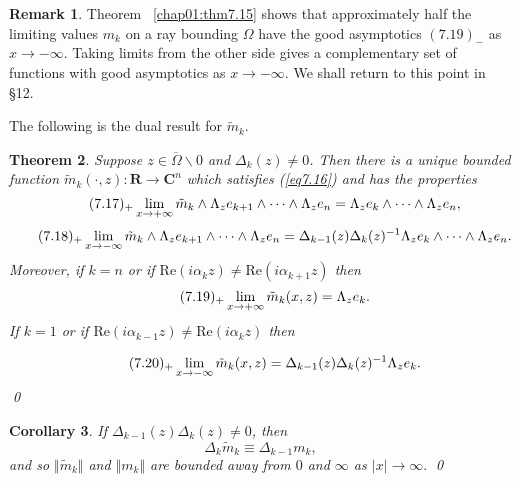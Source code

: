 \documentclass{surv-l}
\theoremstyle{plain}
\newtheorem{theorem}{Theorem}[section]
\newtheorem{cor}[theorem]{Corollary}
\theoremstyle{definition}
\newtheorem{remark}[theorem]{Remark}
\numberwithin{equation}{chapter}
\begin{document}
\setcounter{theorem}{22}
\begin{remark} Theorem ~\ref{chap01:thm7.15} shows that approximately half the limiting values $m_{k}$ on a ray bounding $\Omega$ have the good asymptotics $(7.19)_{-}$ as $ x\rightarrow-\infty$. Taking limits from the other side gives a complementary set of functions with good asymptotics as $ x\rightarrow-\infty$. We shall return to this point in \S12.
\end{remark}
The following is the dual result for $\tilde{m}_{k}$.
\begin{theorem}\label{thm7.24}
Suppose $z\in\overline{\Omega}\backslash 0$ and $\Delta_{k}(z)\neq
0$. Then there is a unique bounded function $\tilde{m}_{k}(\cdot, z) : \mathbf{R}\rightarrow \mathbf{C}^{n}$ which satisfies \emph{(\ref{eq7.16})} and has the properties
\begin{equation*}
\tag*{$(7.17)_{+}$} \displaystyle \lim_{x\rightarrow+\infty} \tilde{m}_{k}\wedge\Lambda_{z}e_{k+1}\wedge\cdots\wedge\Lambda_{z}e_{n}=\Lambda_{z}e_{k}\wedge\cdots\wedge\Lambda_{z}e_{n},
\end{equation*}
\begin{equation*}
\tag*{$(7.18)_{+}$} \displaystyle \lim_{x\rightarrow-\infty} \tilde{m}_{k}\wedge\Lambda_{z}e_{k+1}\wedge\cdots\wedge\Lambda_{z}e_{n}=\Delta_{k-1}(z)\Delta_{k}(z)^{-1}\Lambda_{z}e_{k}\wedge\cdots\wedge\Lambda_{z}e_{n}.
\end{equation*}
Moreover, if $k=n$ or if $\mathrm{Re}(i\alpha_{k}z)\neq\mathrm{Re}(i\alpha_{k+1}z)$ then
\begin{equation*}
\tag*{$(7.19)_{+}$} \displaystyle \lim_{x\rightarrow+\infty} \tilde{m}_{k}(x, z)=\Lambda_{z}e_{k}.
\end{equation*}
If $k=1$ or if $\mathrm{Re}(i\alpha_{k-1}z)\neq\mathrm{Re}(i\alpha_{k}z)$ then

\begin{equation*}
\tag*{$(7.20)_{+}$} \displaystyle \lim_{x\rightarrow-\infty} \tilde{m}_{k}(x, z)=\Delta_{k-1}(z)\Delta_{k}(z)^{-1}\Lambda_{z}e_{k}.\qedhere
\end{equation*}\qed
\end{theorem}
\setcounter{theorem}{24}
\begin{cor}\label{coro7.25}
If $\Delta_{k-1}(z)\Delta_{k}(z)\neq 0$, then
\setcounter{equation}{25}
\begin{equation}\label{eq7.26}
\Delta_{k}\tilde{m}_{k}\equiv\Delta_{k-1} m_{k},
\end{equation}
and so $\Vert\tilde{m}_{k}\Vert$ and $\Vert m_{k}\Vert$ are bounded away from $0$ and $\infty$ as $|x|\rightarrow\infty.$ \qed
\end{cor}
\end{document}
